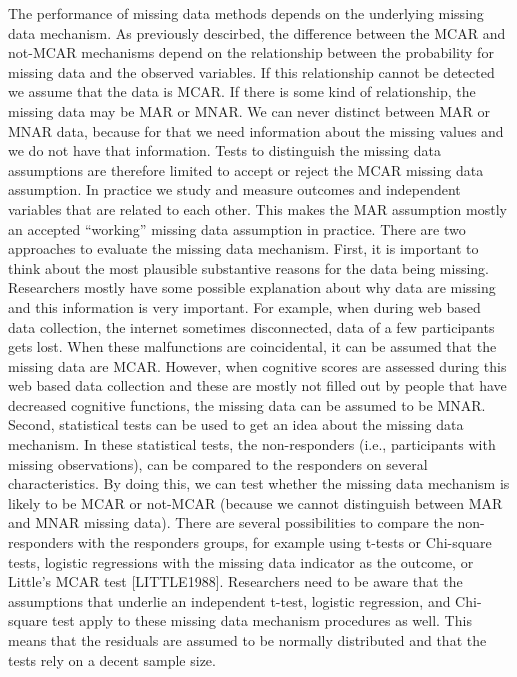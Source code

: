 \documentclass[]{book}
\begin{document}
The performance of missing data methods depends on the underlying
missing data mechanism. As previously descirbed, the difference between
the MCAR and not-MCAR mechanisms depend on the relationship between the
probability for missing data and the observed variables. If this
relationship cannot be detected we assume that the data is MCAR. If
there is some kind of relationship, the missing data may be MAR or MNAR.
We can never distinct between MAR or MNAR data, because for that we need
information about the missing values and we do not have that
information. Tests to distinguish the missing data assumptions are
therefore limited to accept or reject the MCAR missing data assumption.
In practice we study and measure outcomes and independent variables that
are related to each other. This makes the MAR assumption mostly an
accepted ``working'' missing data assumption in practice. There are two
approaches to evaluate the missing data mechanism. First, it is
important to think about the most plausible substantive reasons for the
data being missing. Researchers mostly have some possible explanation
about why data are missing and this information is very important. For
example, when during web based data collection, the internet sometimes
disconnected, data of a few participants gets lost. When these
malfunctions are coincidental, it can be assumed that the missing data
are MCAR. However, when cognitive scores are assessed during this web
based data collection and these are mostly not filled out by people that
have decreased cognitive functions, the missing data can be assumed to
be MNAR. Second, statistical tests can be used to get an idea about the
missing data mechanism. In these statistical tests, the non-responders
(i.e., participants with missing observations), can be compared to the
responders on several characteristics. By doing this, we can test
whether the missing data mechanism is likely to be MCAR or not-MCAR
(because we cannot distinguish between MAR and MNAR missing data). There
are several possibilities to compare the non-responders with the
responders groups, for example using t-tests or Chi-square tests,
logistic regressions with the missing data indicator as the outcome, or
Little's MCAR test {[}LITTLE1988{]}. Researchers need to be aware that
the assumptions that underlie an independent t-test, logistic
regression, and Chi-square test apply to these missing data mechanism
procedures as well. This means that the residuals are assumed to be
normally distributed and that the tests rely on a decent sample size.
\end{document}
